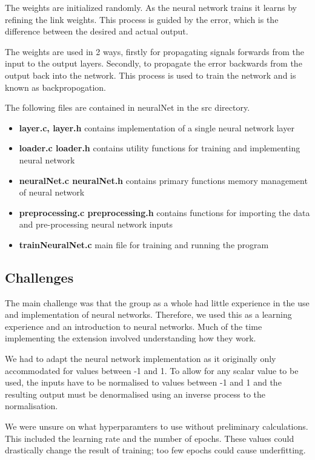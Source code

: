 \documentclass[11pt]{article}
\begin{document}
The weights are initialized randomly. As the neural network trains it learns by refining the link weights. This process is guided by the error, which is the difference between the desired and actual output. 

The weights are used in 2 ways, firstly for propagating signals forwards from the input to the output layers. Secondly, to propagate the error backwards from the output back into the network. This process is used to train the network and is known as backpropogation. 

The following files are contained in neuralNet in the src directory.

\begin{itemize}
    \item \textbf{layer.c, layer.h} contains implementation of a single neural network layer 
    \item \textbf{loader.c loader.h} contains utility functions for training and implementing neural network
    \item \textbf{neuralNet.c neuralNet.h} contains primary functions memory management of neural network
    \item \textbf{preprocessing.c preprocessing.h} contains functions for importing the data and pre-processing neural network inputs
    \item \textbf{trainNeuralNet.c} main file for training and running the program
\end{itemize}

\subsection{Challenges}
The main challenge was that the group as a whole had little experience in the use and implementation of neural networks. 
Therefore, we used this as a learning experience and an introduction to neural networks. 
Much of the time implementing the extension involved understanding how they work.

We had to adapt the neural network implementation as it originally only accommodated for values between -1 and 1.
To allow for any scalar value to be used, the inputs have to be normalised to values between -1 and 1 
and the resulting output must be denormalised using an inverse process to the normalisation.

We were unsure on what hyperparamters to use without preliminary calculations. This included the learning rate and the number of epochs. These values could drastically change the result of training; too few epochs could cause underfitting. 
\end{document}

